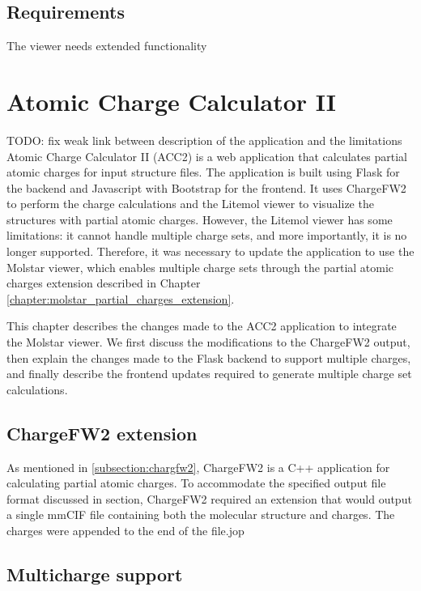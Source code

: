 \documentclass[
  digital,     %
  oneside,     %
  nosansbold,  %
  nocolorbold, %
  lof,         %
  lot,         %
]{fithesis4}
\begin{document}
\section{Requirements}

The viewer needs extended functionality

\chapter{Atomic Charge Calculator II}
\label{chapter:atomic_charge_calculator_ii}

TODO: fix weak link between description of the application and the limitations \\

Atomic Charge Calculator II (ACC2) is a web application that calculates partial atomic charges for input structure files. The application is built using Flask for the backend and Javascript with Bootstrap for the frontend. It uses ChargeFW2 to perform the charge calculations and the Litemol viewer to visualize the structures with partial atomic charges. \parencite{10.1093/nar/gkaa367} However, the Litemol viewer has some limitations: it cannot handle multiple charge sets, and more importantly, it is no longer supported. Therefore, it was necessary to update the application to use the Molstar viewer, which enables multiple charge sets through the partial atomic charges extension described in Chapter \ref{chapter:molstar_partial_charges_extension}.

This chapter describes the changes made to the ACC2 application to integrate the Molstar viewer. We first discuss the modifications to the ChargeFW2 output, then explain the changes made to the Flask backend to support multiple charges, and finally describe the frontend updates required to generate multiple charge set calculations.

\section{ChargeFW2 extension}
\label{section:chargefw2_extension}

As mentioned in \ref{subsection:chargfw2}, ChargeFW2 is a C++ application for calculating partial atomic charges.
To accommodate the specified output file format discussed in section, ChargeFW2 required an extension that would output a single mmCIF file containing both the molecular structure and charges. The charges were appended to the end of the file.jop

\section{Multicharge support}
\label{section:multicharge_support}
\end{document}
